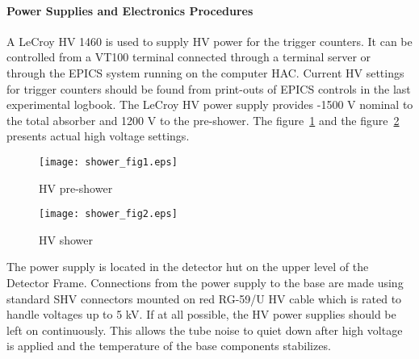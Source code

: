 \documentclass[12pt]{article}
\begin{document}
\paragraph{Power Supplies and Electronics Procedures} 
A LeCroy HV 1460 is used to supply HV power for the trigger
counters. It can be controlled from a VT100 terminal connected through
a terminal server or through the EPICS system running on the computer
HAC.  Current HV settings for trigger counters should be found from
print-outs of EPICS controls in the last experimental logbook. The
LeCroy HV power supply provides -1500 V nominal to the total absorber
and 1200 V to the pre-shower. The figure~\ref{hv_psh} and the
figure~\ref{hv_sh} presents actual high voltage settings.
%
\begin{figure}
\begin{center}
\texttt{[image: shower\_fig1.eps]}
{\linespread{1.}
\caption[High voltage settings of pre-shower]{HV pre-shower}
\label{hv_psh}}
\end{center}
\end{figure}
%
\begin{figure}
\begin{center}
\texttt{[image: shower\_fig2.eps]}
{\linespread{1.}
\caption[High voltage settings of shower]{HV shower}
\label{hv_sh}}
\end{center}
\end{figure}
%

The power supply is located in the detector hut on the upper level of
the Detector Frame. Connections from the power supply to the base are
made using standard SHV connectors mounted on red RG-59/U HV cable
which is rated to handle voltages up to 5 kV.  If at all possible, the
HV power supplies should be left on continuously.  This allows the
tube noise to quiet down after high voltage is applied and the
temperature of the base components stabilizes.
%
\end{document}
